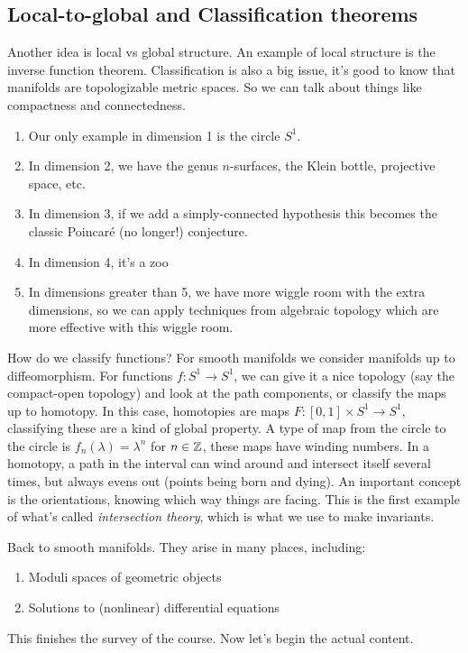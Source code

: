 \subsection{Local-to-global and Classification theorems}
Another idea is local vs global structure. An example of local structure is the inverse function theorem. Classification is also a big issue, it's good to know that manifolds are topologizable metric spaces. So we can talk about things like compactness and connectedness.
\begin{enumerate}[label=(\arabic*)]
    \item Our only example in dimension 1 is the circle $S^1 $.
    \item In dimension 2, we have the genus $n$-surfaces, the Klein bottle, projective space, etc.
    \item In dimension 3, if we add a simply-connected hypothesis this becomes the classic Poincar\'e (no longer!) conjecture.
    \item In dimension 4, it's a zoo
    \item In dimensions greater than 5, we have more wiggle room with the extra dimensions, so we can apply techniques from algebraic topology which are more effective with this wiggle room.
\end{enumerate}
How do we classify functions? For smooth manifolds we consider manifolds up to diffeomorphism. For functions $f \colon S^1  \to S^1 $, we can give it a nice topology (say the compact-open topology) and look at the path components, or classify the maps up to homotopy. In this case, homotopies are maps $F \colon [0,1]\times  S^1  \to S^1 $, classifying these are a kind of global property. A type of map from the circle to the circle is $f_n (\lambda)=\lambda ^n $ for $n \in \mathbb{Z}$, these maps have winding numbers. In a homotopy, a path in the interval can wind around and intersect itself several times, but always evens out (points being born and dying). An important concept is the orientations, knowing which way things are facing. This is the first example of what's called \emph{intersection theory}, which is what we use to make invariants.

Back to smooth manifolds. They arise in many places, including:
\begin{enumerate}[label=(\arabic*)]
    \item Moduli spaces of geometric objects
    \item Solutions to (nonlinear) differential equations
\end{enumerate}
\orbreak
This finishes the survey of the course. Now let's begin the actual content.

